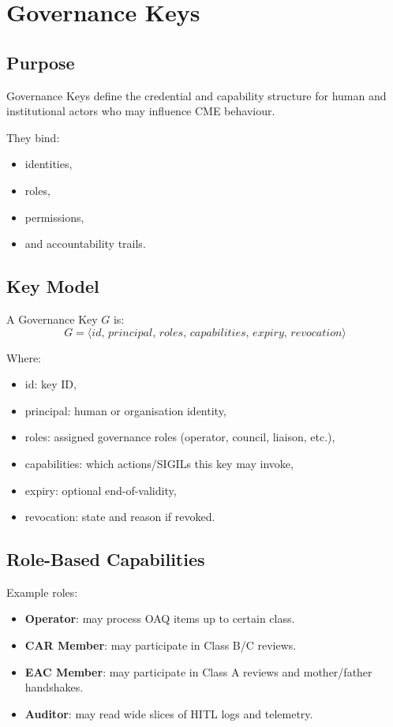 \chapter{Governance Keys}
\label{chap:Governance_Keys}

\section{Purpose}

Governance Keys define the credential and capability structure for human
and institutional actors who may influence CME behaviour.

They bind:
\begin{itemize}
    \item identities,
    \item roles,
    \item permissions,
    \item and accountability trails.
\end{itemize}

\section{Key Model}

A Governance Key $G$ is:
\[
G = \langle id,\, principal,\, roles,\, capabilities,\, expiry,\, revocation \rangle
\]

Where:
\begin{itemize}
    \item id: key ID,
    \item principal: human or organisation identity,
    \item roles: assigned governance roles (operator, council, liaison, etc.),
    \item capabilities: which actions/SIGILs this key may invoke,
    \item expiry: optional end-of-validity,
    \item revocation: state and reason if revoked.
\end{itemize}

\section{Role-Based Capabilities}

Example roles:
\begin{itemize}
    \item \textbf{Operator}: may process OAQ items up to certain class.
    \item \textbf{CAR Member}: may participate in Class B/C reviews.
    \item \textbf{EAC Member}: may participate in Class A reviews and
          mother/father handshakes.
    \item \textbf{Auditor}: may read wide slices of HITL logs and telemetry.
\end{itemize}

